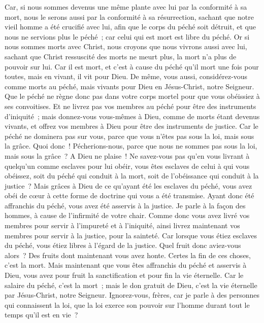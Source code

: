 \begin{multicols}{2}
Car, si nous sommes devenus une même plante avec lui par la conformité à sa mort, nous le serons aussi par la conformité à sa résurrection,
sachant que notre vieil homme a été crucifié avec lui, afin que le corps du péché soit détruit, et que nous ne servions plus le péché~;
car celui qui est mort est libre du péché.
Or si nous sommes morts avec Christ, nous croyons que nous vivrons aussi avec lui,
sachant que Christ ressuscité des morts ne meurt plus, la mort n'a plus de pouvoir sur lui.
Car il est mort, et c'est à cause du péché qu'il mort une fois pour toutes, mais en vivant, il vit pour Dieu.
De même, vous aussi, considérez-vous comme morts au péché, mais vivants pour Dieu en Jésus-Christ, notre Seigneur.
Que le péché ne règne donc pas dans votre corps mortel pour que vous obéissiez à ses convoitises.
Et ne livrez pas vos membres au péché pour être des instruments d'iniquité~; mais donnez-vous vous-mêmes à Dieu, comme de morts étant devenus vivants, et offrez vos membres à Dieu pour être des instruments de justice.
Car le péché ne dominera pas sur vous, parce que vous n'êtes pas sous la loi, mais sous la grâce.
Quoi donc~! Pécherions-nous, parce que nous ne sommes pas sous la loi, mais sous la grâce~? A Dieu ne plaise~!
Ne savez-vous pas qu'en vous livrant à quelqu'un comme esclaves pour lui obéir, vous êtes esclaves de celui à qui vous obéissez, soit du péché qui conduit à la mort, soit de l'obéissance qui conduit à la justice~?
Mais grâces à Dieu de ce qu'ayant été les esclaves du péché, vous avez obéi de cœur à cette forme de doctrine qui vous a été transmise.
Ayant donc été affranchis du péché, vous avez été asservis à la justice.
Je parle à la façon des hommes, à cause de l'infirmité de votre chair. Comme donc vous avez livré vos membres pour servir à l'impureté et à l'iniquité, ainsi livrez maintenant vos membres pour servir à la justice, pour la sainteté.
Car lorsque vous étiez esclaves du péché, vous étiez libres à l'égard de la justice.
Quel fruit donc aviez-vous alors~? Des fruits dont maintenant vous avez honte. Certes la fin de ces choses, c'est la mort.
Mais maintenant que vous êtes affranchis du péché et asservis à Dieu, vous avez pour fruit la sanctification et pour fin la vie éternelle.
Car le salaire du péché, c'est la mort~; mais le don gratuit de Dieu, c'est la vie éternelle par Jésus-Christ, notre Seigneur.
\VerseOne{}Ignorez-vous, frères, car je parle à des personnes qui connaissent la loi, que la loi exerce son pouvoir sur l'homme durant tout le temps qu'il est en vie~?

\end{multicols}
